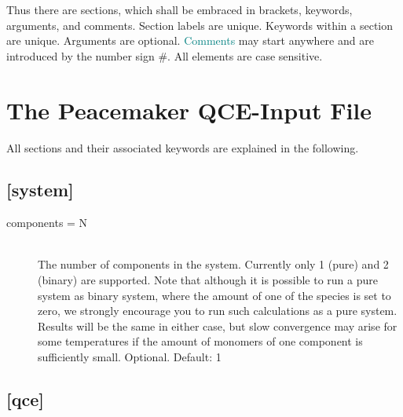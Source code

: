 \documentclass{scrartcl}
\begin{document}
Thus there are sections, which shall be embraced in brackets, keywords, arguments, and comments.
Section labels are unique.
Keywords within a section are unique.
Arguments are optional.
\textcolor{teal}{Comments} may start anywhere and are introduced by the number sign \#.
All elements are case sensitive.

\newpage

\section{The Peacemaker QCE-Input File}
\label{sec:input}

All sections and their associated keywords are explained in the following.

\subsection*{[system]}
\vspace{-0.3cm}

\begin{description}
    \item[components = N] \hfill \\
        The number of components in the system.
        Currently only 1 (pure) and 2 (binary) are supported.
        Note that although it is possible to run a pure system as binary system, where the amount of 
        one of the species is set to zero, we strongly encourage you to run such calculations as a pure system.
        Results will be the same in either case, but slow convergence may arise for some temperatures 
        if the amount of monomers of one component is sufficiently small.
        Optional. Default: 1
\end{description}

\subsection*{[qce]}
\vspace{-0.3cm}
\end{document}

